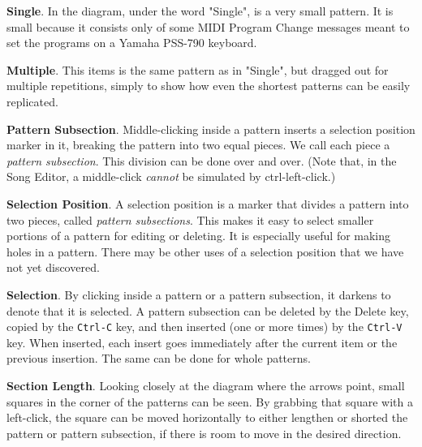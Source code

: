    \begin{enumber}
      \item \textbf{Single}.
         In the diagram, under the word "Single", is a very small pattern.
         It is small because it consists only of some MIDI Program Change
         messages meant to set the programs on a Yamaha PSS-790 keyboard.
      \item \textbf{Multiple}.
         This items is the same pattern as in "Single", but dragged out for
         multiple repetitions, simply to show how even the shortest patterns
         can be easily replicated.
      \item \textbf{Pattern Subsection}.
         Middle-clicking inside a pattern inserts a selection position
         marker in it, breaking the pattern into two equal pieces.
         We call each piece a \textsl{pattern subsection}.
         This division can be done over and over.
         (Note that, in the Song Editor, a middle-click
          \textsl{cannot} be simulated by ctrl-left-click.)
      \item \textbf{Selection Position}.
         A selection position is a marker that divides a pattern into two
         pieces, called \textsl{pattern subsections}.  This makes it easy to
         select smaller portions of a pattern for editing or deleting.  It
         is especially useful for making holes in a pattern.  There may be
         other uses of a selection position that we have not yet discovered.
      \item \textbf{Selection}.
         By clicking inside a pattern or a pattern subsection, it darkens to
         denote that it is selected.
         A pattern subsection can be deleted by the
         Delete key, copied by the
         \texttt{Ctrl-C} key, and then inserted (one or more times) by the
         \texttt{Ctrl-V} key.  When inserted, each insert goes immediately
         after the current item or the previous insertion.  The same can be
         done for whole patterns.
      \item \textbf{Section Length}.
         Looking closely at the diagram where the arrows point, small
         squares in the corner of the patterns can be seen.  By grabbing
         that square with a left-click, the square can be moved horizontally
         to either lengthen or shorted the pattern or pattern subsection, if
         there is room to move in the desired direction.

\end{enumber}
